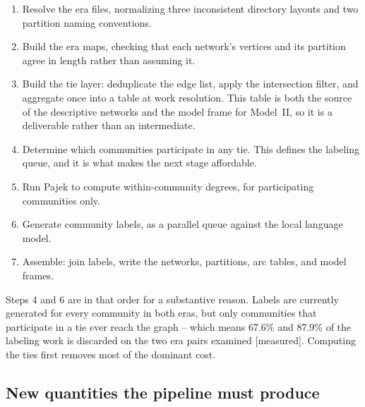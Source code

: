 \documentclass[11pt]{article}
\newcommand{\meas}{{\footnotesize\textsf{[measured]}}}
\begin{document}
\begin{enumerate}[leftmargin=2em, itemsep=1pt]
  \item Resolve the era files, normalizing three inconsistent directory layouts and two
        partition naming conventions.
  \item Build the era maps, checking that each network's vertices and its partition agree
        in length rather than assuming it.
  \item Build the tie layer: deduplicate the edge list, apply the intersection filter, and
        aggregate once into a table at work resolution. This table is both the source of the
        descriptive networks and the model frame for Model~II, so it is a deliverable rather
        than an intermediate.
  \item Determine which communities participate in any tie. This defines the labeling queue,
        and it is what makes the next stage affordable.
  \item Run Pajek to compute within-community degrees, for participating communities only.
  \item Generate community labels, as a parallel queue against the local language model.
  \item Assemble: join labels, write the networks, partitions, arc tables, and model frames.
\end{enumerate}

Steps 4 and 6 are in that order for a substantive reason. Labels are currently generated
for every community in both eras, but only communities that participate in a tie ever reach
the graph -- which means 67.6\% and 87.9\% of the labeling work is discarded on the two era
pairs examined \meas{}. Computing the ties first removes most of the dominant cost.

\subsection{New quantities the pipeline must produce}
\end{document}
